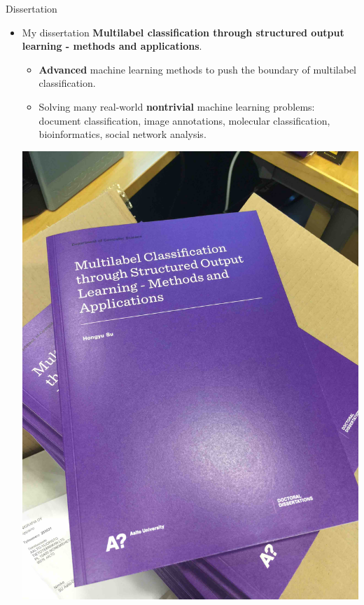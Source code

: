 \documentclass[first=dgreen,second=purple,logo=yellowexc]{aaltoslides}
\begin{document}
\begin{frame}{Dissertation}
	\begin{itemize}
		\item My dissertation {\bf Multilabel classification through structured output learning - methods and applications}.
		\begin{itemize}\footnotesize
			\item {\bf Advanced} machine learning methods to push the boundary of multilabel classification.
			\item Solving many real-world {\bf nontrivial} machine learning problems: document classification, image annotations, molecular classification, bioinformatics, social network analysis.
		\end{itemize}
		\begin{center}
			\includegraphics[scale=0.03,angle=-90]{./plots/book.jpg}
		\end{center}
	\end{itemize}
\end{frame}
\end{document}
